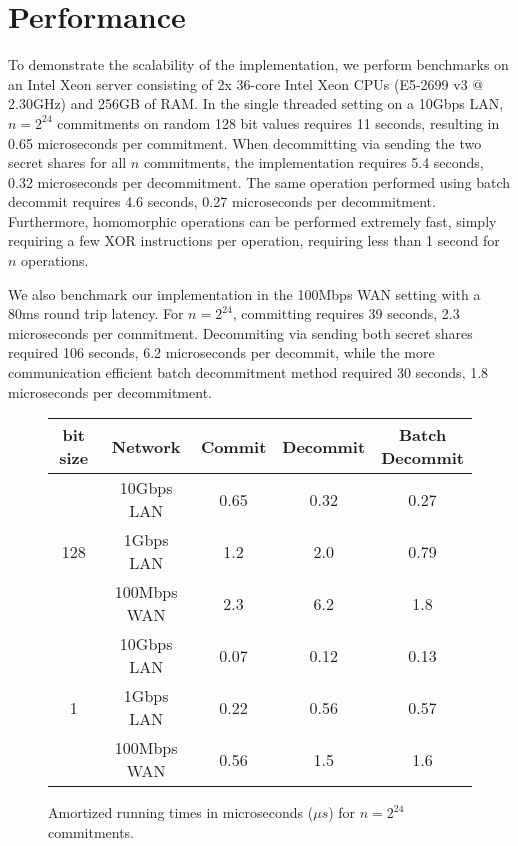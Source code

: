
\section{Performance}
To demonstrate the scalability of the implementation, we perform benchmarks on an Intel Xeon server consisting of 2x 36-core Intel Xeon CPUs (E5-2699 v3 @ 2.30GHz) and 256GB of RAM. In the single threaded setting on a 10Gbps LAN, $n=2^{24}$ commitments on random 128 bit values requires 11 seconds, resulting in 0.65 microseconds per commitment. When decommitting via sending the two secret shares for all $n$ commitments, the implementation requires 5.4 seconds, 0.32 microseconds per decommitment. The same operation performed using batch decommit requires 4.6 seconds, 0.27 microseconds per decommitment. Furthermore, homomorphic operations can be performed extremely fast, simply requiring  a few XOR instructions per operation, requiring less than 1 second for $n$ operations.

We also benchmark our implementation in the 100Mbps WAN setting with a 80ms round trip latency. For $n=2^{24}$, committing  requires 39 seconds, 2.3 microseconds per commitment. Decommiting via sending both secret shares required 106 seconds, 6.2 microseconds per decommit, while the more communication efficient batch decommitment method required 30 seconds, 1.8 microseconds per decommitment.

\begin{figure}
\begin{center}
  \small
  \begin{tabular}{|c|c|c|c|c|}
  	\hline
  	      bit size       &   Network   & Commit & Decommit & \shortstack{Batch \\Decommit} \\ \hline
  	\multirow{3}{*}{128} & 10Gbps LAN  &  0.65  &   0.32   &             0.27              \\
  	                     &  1Gbps LAN  &  1.2   &   2.0    &             0.79              \\
  	                     & 100Mbps WAN &  2.3   &   6.2    &              1.8              \\ \hline
  	 \multirow{3}{*}{1}  & 10Gbps LAN  &  0.07  &   0.12   &             0.13              \\
  	                     &  1Gbps LAN  &  0.22  &   0.56   &             0.57              \\
  	                     & 100Mbps WAN &  0.56  &   1.5    &              1.6              \\ \hline
  \end{tabular}
  \caption{Amortized running times in microseconds ($\mu s$) for $n = 2^{24}$ commitments.}
  \end{center}
\end{figure}

